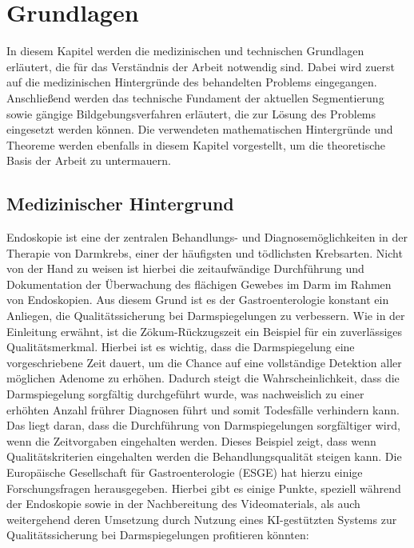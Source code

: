 \chapter{Grundlagen}\label{ch:preliminaries}

In diesem Kapitel werden die medizinischen und technischen Grundlagen erläutert, die für das Verständnis der Arbeit notwendig sind.
Dabei wird zuerst auf die medizinischen Hintergründe des behandelten Problems eingegangen.
Anschließend werden das technische Fundament der aktuellen Segmentierung sowie gängige Bildgebungsverfahren erläutert, die zur Lösung des Problems eingesetzt werden können.
Die verwendeten mathematischen Hintergründe und Theoreme werden ebenfalls in diesem Kapitel vorgestellt, um die theoretische Basis der Arbeit zu untermauern.

\section{Medizinischer Hintergrund}
Endoskopie ist eine der zentralen Behandlungs- und Diagnosemöglichkeiten in der Therapie von Darmkrebs, 
einer der häufigsten und tödlichsten Krebsarten.\citep{labianca2010-colon-cancer}\footnotemark{} 
Nicht von der Hand zu weisen ist hierbei die zeitaufwändige Durchführung und 
Dokumentation der Überwachung des flächigen Gewebes im Darm im Rahmen von Endoskopien. Aus diesem Grund ist es 
der Gastroenterologie konstant ein Anliegen, die Qualitätssicherung bei Darmspiegelungen zu verbessern. 
Wie in der Einleitung erwähnt, ist die Zökum-Rückzugszeit ein Beispiel für ein zuverlässiges Qualitätsmerkmal.  Hierbei ist es wichtig, dass die Darmspiegelung eine vorgeschriebene Zeit dauert, um die Chance auf eine vollständige Detektion aller möglichen Adenome zu erhöhen. 
Dadurch steigt die Wahrscheinlichkeit, dass die Darmspiegelung sorgfältig durchgeführt wurde, was nachweislich zu einer 
erhöhten Anzahl frührer Diagnosen führt und somit Todesfälle verhindern kann. Das liegt daran, dass die Durchführung von Darmspiegelungen sorgfältiger wird, wenn 
die Zeitvorgaben eingehalten werden.
Dieses Beispiel zeigt, dass wenn Qualitätskriterien eingehalten werden die Behandlungsqualität steigen kann. 
Die Europäische Gesellschaft für Gastroenterologie (ESGE) hat hierzu einige Forschungsfragen herausgegeben. Hierbei gibt es einige Punkte, speziell während der Endoskopie sowie in der Nachbereitung des Videomaterials, als auch weitergehend deren Umsetzung durch Nutzung eines KI-gestützten Systems zur Qualitätssicherung bei Darmspiegelungen profitieren könnten:

